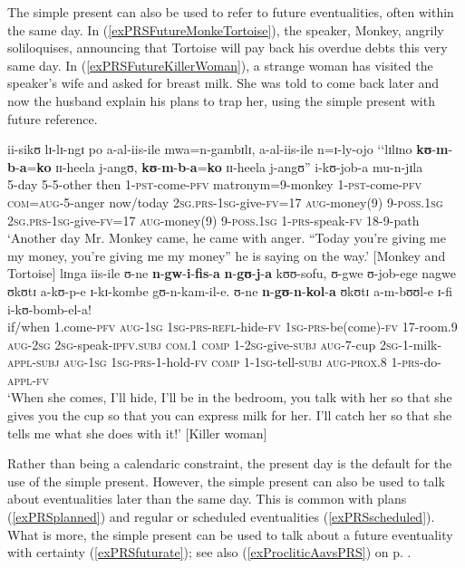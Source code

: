 The simple present can also be used to refer to future eventualities, often within the same day. In (\ref{exPRSFutureMonkeTortoise}), the speaker, Monkey, angrily soliloquises, announcing that Tortoise will pay back his overdue debts this very same day. In (\ref{exPRSFutureKillerWoman}), a strange woman has visited the speaker's wife and asked for breast milk. She was told to come back later and now the husband explain his plans to trap her, using the simple present with future reference. 
\begin{exe}
\ex \label{exPRSFutureMonkeTortoise}\gll ii-sikʊ lɪ-lɪ-ngɪ po a-al-iis-ile mwa=n-gambɪlɪ, a-al-iis-ile n=ɪ-ly-ojo \textup{\lq\lq}lɪlɪno \textbf{kʊ}-\textbf{m}-\textbf{b}-\textbf{a}=\textbf{ko} ɪɪ-heela j-angʊ, \textbf{kʊ}-\textbf{m}-\textbf{b}-\textbf{a}=\textbf{ko} ɪɪ-heela j-angʊ\textup{''} i-kʊ-job-a mu-n-jɪla\\
5-day 5-5-other then 1-\textsc{pst}-come-\textsc{pfv} matronym=9-monkey 1-\textsc{pst}-come-\textsc{pfv} \textsc{com}=\textsc{aug}-5-anger \phantom{\lq\lq}now/today \textsc{2sg.prs}-\textsc{1sg}-give-\textsc{fv}=17 \textsc{aug}-money(9) 9-\textsc{poss.1sg} \textsc{2sg.prs}-\textsc{1sg}-give-\textsc{fv}=17 \textsc{aug}-money(9) 9-\textsc{poss.1sg} 1-\textsc{prs}-speak-\textsc{fv} 18-9-path\\
\glt `Another day Mr. Monkey came, he came with anger. ``Today you're giving me my money, you're giving me my money'' he is saying on the way.' [Monkey and Tortoise]
\ex \label{exPRSFutureKillerWoman} \gll lɪnga iis-ile ʊ-ne \textbf{n}-\textbf{gw}-\textbf{i}-\textbf{fis}-\textbf{a} \textbf{n}-\textbf{gʊ}-\textbf{j}-\textbf{a} kʊʊ-sofu, ʊ-gwe ʊ-job-ege nagwe ʊkʊtɪ a-kʊ-p-e ɪ-kɪ-kombe gʊ-n-kam-il-e. ʊ-ne \textbf{n}-\textbf{gʊ}-\textbf{n}-\textbf{kol}-\textbf{a} ʊkʊtɪ a-m-bʊʊl-e ɪ-fi i-kʊ-bomb-el-a!\\
if/when 1.come-\textsc{pfv} \textsc{aug}-\textsc{1sg} \textsc{1sg}-\textsc{prs}-\textsc{refl}-hide-\textsc{fv} \textsc{1sg}-\textsc{prs}-be(come)-\textsc{fv} 17-room.9 \textsc{aug}-\textsc{2sg} \textsc{2sg}-speak-\textsc{ipfv.subj} \textsc{com}.1 \textsc{comp} 1-\textsc{2sg}-give-\textsc{subj} \textsc{aug}-7-cup \textsc{2sg}-1-milk-\textsc{appl}-\textsc{subj} \textsc{aug}-\textsc{1sg} \textsc{1sg}-\textsc{prs}-1-hold-\textsc{fv} \textsc{comp} 1-\textsc{1sg}-tell-\textsc{subj} \textsc{aug}-\textsc{prox.8} 1-\textsc{prs}-do-\textsc{appl}-\textsc{fv}\\
\glt `When she comes, I'll hide, I'll be in the bedroom, you talk with her so that she gives you the cup so that you can express milk for her. I'll catch her so that she tells me what she does with it!' [Killer woman]
\end{exe}
Rather than being a calendaric constraint, the present day is the default for the  use of the simple present. However, the simple present can also be used to talk about eventualities later than the same day. This is common with plans (\ref{exPRSplanned}) and regular or scheduled eventualities (\ref{exPRSscheduled}). What is more, the simple present can be used to talk about a future eventuality with certainty (\ref{exPRSfuturate}); see also (\ref{exProcliticAavsPRS}) on p. \pageref{exProcliticAavsPRS}.

